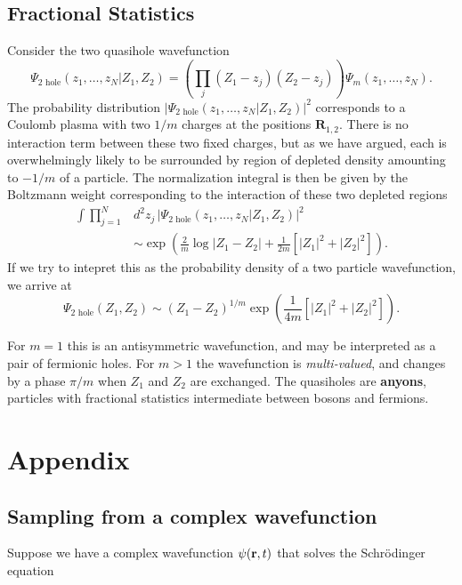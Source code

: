 \documentclass[
  letterpaper,
  DIV=11,
  numbers=noendperiod]{scrreprt}
\begin{document}
\section{Fractional Statistics}\label{fractional-statistics}

Consider the two quasihole wavefunction \[
\Psi_\text{2 hole}(z_1,\ldots, z_N|Z_1,Z_2) = \left(\prod_j (Z_1-z_j)(Z_2-z_j)\right)\Psi_m(z_1,\ldots, z_N).
\label{many_2hole}
\] The probability distribution
\(\vert\Psi_\text{2 hole}(z_1,\ldots, z_N\vert Z_1,Z_2)\rvert^2\)
corresponds to a Coulomb plasma with two \(1/m\) charges at the
positions \(\mathbf{R}_{1,2}\). There is no interaction term between
these two fixed charges, but as we have argued, each is overwhelmingly
likely to be surrounded by region of depleted density amounting to
\(-1/m\) of a particle. The normalization integral is then be given by
the Boltzmann weight corresponding to the interaction of these two
depleted regions \[
\begin{align}
\int \prod_{j=1}^N &d^2z_j\,\lvert\Psi_\text{2 hole}(z_1,\ldots, z_N\vert Z_1,Z_2)\rvert^2\\ &\sim\exp\left(\frac{2}{m}\log\left|Z_1-Z_2\right|+\frac{1}{2m}\left[\left|Z_1\right|^2+\left|Z_2\right|^2\right]\right).
\end{align}
\] If we try to intepret this as the probability density of a two
particle wavefunction, we arrive at \[
\Psi_\text{2 hole}(Z_1,Z_2) \sim \left(Z_1-Z_2\right)^{1/m} \exp\left(\frac{1}{4m}\left[\left|Z_1\right|^2+\left|Z_2\right|^2\right]\right).
\]

For \(m=1\) this is an antisymmetric wavefunction, and may be
interpreted as a pair of fermionic holes. For \(m>1\) the wavefunction
is \emph{multi-valued}, and changes by a phase \(\pi/m\) when \(Z_1\)
and \(Z_2\) are exchanged. The quasiholes are \textbf{anyons}, particles
with fractional statistics intermediate between bosons and fermions.

\chapter{Appendix}\label{appendix}

\section{Sampling from a complex
wavefunction}\label{sampling-from-a-complex-wavefunction}

Suppose we have a complex wavefunction \(\psi(\mathbf{r},t)\) that solves the
Schrödinger equation
\end{document}
